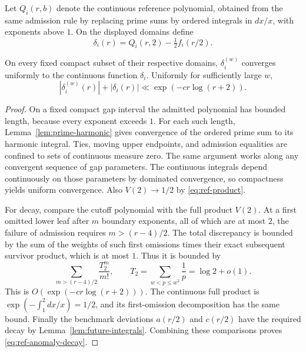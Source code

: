 Let $Q_i(r,b)$ denote the continuous reference polynomial, obtained
from the same admission rule by replacing prime sums by ordered
integrals in $dx/x$, with exponents above $1$.  On the displayed
domains define
\begin{equation}\label{eq:ref-cont-anomaly}
 \delta_i(r)=Q_i(r,2)-\tfrac12 f_i(r/2).
\end{equation}

\begin{lemma}\label{lem:ref-anomaly}
On every fixed compact subset of their respective domains,
$\delta_i^{(w)}$ converges uniformly to the continuous function
$\delta_i$.  Uniformly for sufficiently large $w$,
\begin{equation}\label{eq:ref-anomaly-decay}
 |\delta_i^{(w)}(r)|+|\delta_i(r)|
       \ll\exp(-c r\log(r+2)).
\end{equation}
\end{lemma}

\begin{proof}
On a fixed compact gap interval the admitted polynomial has bounded
length, because every exponent exceeds $1$.  For each such length,
Lemma~\ref{lem:prime-harmonic} gives convergence of the ordered prime
sum to its harmonic integral.  Ties, moving upper endpoints, and
admission equalities are confined to sets of continuous measure zero.
The same argument works along any convergent sequence of gap
parameters.  The continuous integrals depend continuously on those
parameters by dominated convergence, so compactness yields uniform
convergence.  Also $V(2)\to1/2$ by \eqref{eq:ref-product}.

For decay, compare the cutoff polynomial with the full product $V(2)$.
At a first omitted lower leaf after $m$ boundary exponents, all of
which are at most $2$, the failure of admission requires
$m>(r-4)/2$.  The total discrepancy is bounded by the sum of the
weights of such first omissions times their exact subsequent survivor
product, which is at most $1$.  Thus it is bounded by
\[
 \sum_{m>(r-4)/2}\frac{T_2^m}{m!},\qquad
 T_2=\sum_{w<p\leq w^2}\frac1p=\log2+o(1).
\]
This is $O(\exp(-c r\log(r+2)))$.  The continuous full product is
$\exp(-\int_1^2 dx/x)=1/2$, and its first-omission decomposition has
the same bound.  Finally the benchmark deviations $a(r/2)$ and
$c(r/2)$ have the required decay by
Lemma~\ref{lem:future-integrals}.  Combining these comparisons proves
\eqref{eq:ref-anomaly-decay}.
\end{proof}

